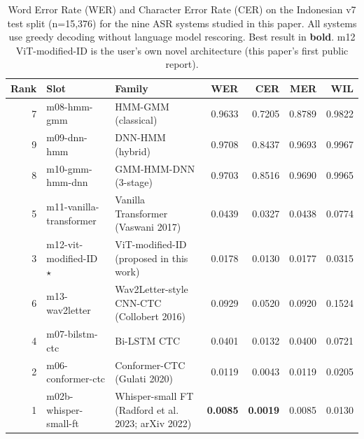 \begin{table}[t]
  \centering
  \caption{Word Error Rate (WER) and Character Error Rate (CER) on the Indonesian v7 test split (n=15{,}376) for the nine ASR systems studied in this paper. All systems use greedy decoding without language model rescoring. Best result in \textbf{bold}. m12 ViT-modified-ID is the user's own novel architecture (this paper's first public report).}
  \label{tab:paper_benchmark}
  \small
  \begin{tabular}{rllrrrr}
  \hline
  Rank & Slot & Family & WER & CER & MER & WIL \\
  \hline
  7 & m08-hmm-gmm & HMM-GMM (classical) & 0.9633 & 0.7205 & 0.8789 & 0.9822 \\
  9 & m09-dnn-hmm & DNN-HMM (hybrid) & 0.9708 & 0.8437 & 0.9693 & 0.9967 \\
  8 & m10-gmm-hmm-dnn & GMM-HMM-DNN (3-stage) & 0.9703 & 0.8516 & 0.9690 & 0.9965 \\
  5 & m11-vanilla-transformer & Vanilla Transformer (Vaswani 2017) & 0.0439 & 0.0327 & 0.0438 & 0.0774 \\
  3 & m12-vit-modified-ID $\star$ & ViT-modified-ID (proposed in this work) & 0.0178 & 0.0130 & 0.0177 & 0.0315 \\
  6 & m13-wav2letter & Wav2Letter-style CNN-CTC (Collobert 2016) & 0.0929 & 0.0520 & 0.0920 & 0.1524 \\
  4 & m07-bilstm-ctc & Bi-LSTM CTC & 0.0401 & 0.0132 & 0.0400 & 0.0721 \\
  2 & m06-conformer-ctc & Conformer-CTC (Gulati 2020) & 0.0119 & 0.0043 & 0.0119 & 0.0205 \\
  1 & m02b-whisper-small-ft & Whisper-small FT (Radford et al. 2023; arXiv 2022) & \textbf{0.0085} & \textbf{0.0019} & 0.0085 & 0.0130 \\
  \hline
  \end{tabular}
\end{table}